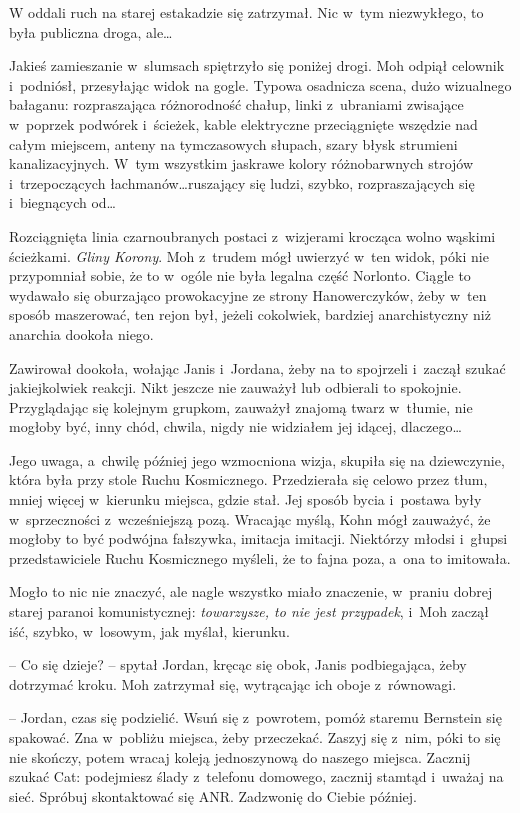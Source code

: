 \documentclass[oneside,polish,11pt,sfheadings]{mwbk}
\begin{document}
W oddali ruch na starej estakadzie się zatrzymał. Nic w~tym niezwykłego,
to była publiczna droga, ale\ldots

Jakieś zamieszanie w~slumsach spiętrzyło się poniżej drogi. Moh odpiął
celownik i~podniósł, przesyłając widok na gogle. Typowa osadnicza scena,
dużo wizualnego bałaganu: rozpraszająca różnorodność chałup, linki z~ubraniami zwisające w~poprzek podwórek i~ścieżek, kable elektryczne
przeciągnięte wszędzie nad całym miejscem, anteny na tymczasowych
słupach, szary błysk strumieni kanalizacyjnych. W~tym wszystkim jaskrawe
kolory różnobarwnych strojów i~trzepoczących łachmanów\ldots ruszający się
ludzi, szybko, rozpraszających się i~biegnących od\ldots

Rozciągnięta linia czarnoubranych postaci z~wizjerami krocząca wolno
wąskimi ścieżkami. \emph{Gliny Korony}. Moh z~trudem mógł uwierzyć w~ten
widok, póki nie przypomniał sobie, że to w~ogóle nie była legalna część
Norlonto. Ciągle to wydawało się oburzająco prowokacyjne ze strony
Hanowerczyków, żeby w~ten sposób maszerować, ten rejon był, jeżeli
cokolwiek, bardziej anarchistyczny niż anarchia dookoła niego.

Zawirował dookoła, wołając Janis i~Jordana, żeby na to spojrzeli i~zaczął szukać jakiejkolwiek reakcji. Nikt jeszcze nie zauważył lub
odbierali to spokojnie. Przyglądając się kolejnym grupkom, zauważył
znajomą twarz w~tłumie, nie mogłoby być, inny chód, chwila, nigdy nie
widziałem jej idącej, dlaczego\ldots

Jego uwaga, a~chwilę później jego wzmocniona wizja, skupiła się na
dziewczynie, która była przy stole Ruchu Kosmicznego. Przedzierała się
celowo przez tłum, mniej więcej w~kierunku miejsca, gdzie stał. Jej
sposób bycia i~postawa były w~sprzeczności z~wcześniejszą pozą. Wracając
myślą, Kohn mógł zauważyć, że mogłoby to być podwójna fałszywka,
imitacja imitacji. Niektórzy młodsi i~głupsi przedstawiciele Ruchu
Kosmicznego myśleli, że to fajna poza, a~ona to imitowała.

Mogło to nic nie znaczyć, ale nagle wszystko miało znaczenie, w~praniu
dobrej starej paranoi komunistycznej: \emph{towarzysze, to nie jest
przypadek}, i~Moh zaczął iść, szybko, w~losowym, jak myślał, kierunku.

-- Co się dzieje? -- spytał Jordan, kręcąc się obok, Janis podbiegająca,
żeby dotrzymać kroku. Moh zatrzymał się, wytrącając ich oboje z~równowagi.

-- Jordan, czas się podzielić. Wsuń się z~powrotem, pomóż staremu
Bernstein się spakować. Zna w~pobliżu miejsca, żeby przeczekać. Zaszyj
się z~nim, póki to się nie skończy, potem wracaj koleją jednoszynową do
naszego miejsca. Zacznij szukać Cat: podejmiesz ślady z~telefonu
domowego, zacznij stamtąd i~uważaj na sieć. Spróbuj skontaktować się
ANR. Zadzwonię do Ciebie później.
\end{document}
